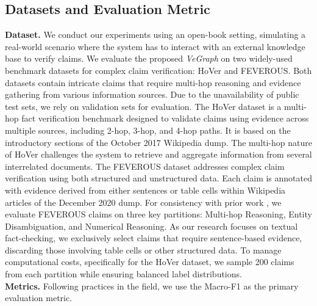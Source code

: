 \documentclass[11pt]{article}
\begin{document}
\subsection{Datasets and Evaluation Metric}
\textbf{Dataset.} We conduct our experiments using an open-book setting, simulating a real-world scenario where the system has to interact with an external knowledge base to verify claims. We evaluate the proposed \textit{VeGraph} on two widely-used benchmark datasets for complex claim verification: HoVer and FEVEROUS. Both datasets contain intricate claims that require multi-hop reasoning and evidence gathering from various information sources. Due to the unavailability of public test sets, we rely on validation sets for evaluation. The HoVer dataset \cite{hover_dataset} is a multi-hop fact verification benchmark designed to validate claims using evidence across multiple sources, including 2-hop, 3-hop, and 4-hop paths. It is based on the introductory sections of the October 2017 Wikipedia dump. The multi-hop nature of HoVer challenges the system to retrieve and aggregate information from several interrelated documents. The FEVEROUS dataset \cite{feverous_dataset} addresses complex claim verification using both structured and unstructured data. Each claim is annotated with evidence derived from either sentences or table cells within Wikipedia articles of the December 2020 dump. For consistency with prior work \cite{feverous_dataset}, we evaluate FEVEROUS claims on three key partitions: Multi-hop Reasoning, Entity Disambiguation, and Numerical Reasoning. As our research focuses on textual fact-checking, we exclusively select claims that require sentence-based evidence, discarding those involving table cells or other structured data. To manage computational costs, specifically for the HoVer dataset, we sample 200 claims from each partition while ensuring balanced label distributions.
\\
\textbf{Metrics.} Following practices in the field, we use the Macro-F1 as the primary evaluation metric.
\end{document}
